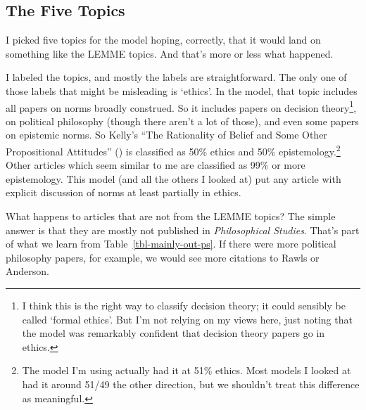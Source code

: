 \documentclass[
  10pt,
  letterpaper,
  DIV=11,
  numbers=noendperiod,
  twoside]{scrartcl}
\begin{document}
\subsection{The Five Topics}\label{sec-five-topics}

I picked five topics for the model hoping, correctly, that it would land
on something like the LEMME topics. And that's more or less what
happened.

I labeled the topics, and mostly the labels are straightforward. The
only one of those labels that might be misleading is `ethics'. In the
model, that topic includes all papers on norms broadly construed. So it
includes papers on decision theory\footnote{I think this is the right
  way to classify decision theory; it could sensibly be called `formal
  ethics'. But I'm not relying on my views here, just noting that the
  model was remarkably confident that decision theory papers go in
  ethics.}, on political philosophy (though there aren't a lot of
those), and even some papers on epistemic norms. So Kelly's ``The
Rationality of Belief and Some Other Propositional Attitudes''
() is classified as 50\%
ethics and 50\% epistemology.\footnote{The model I'm using actually had
  it at 51\% ethics. Most models I looked at had it around 51/49 the
  other direction, but we shouldn't treat this difference as meaningful.}
Other articles which seem similar to me are classified as 99\% or more
epistemology. This model (and all the others I looked at) put any
article with explicit discussion of norms at least partially in ethics.

What happens to articles that are not from the LEMME topics? The simple
answer is that they are mostly not published in \emph{Philosophical
Studies}. That's part of what we learn from
Table~\ref{tbl-mainly-out-ps}. If there were more political philosophy
papers, for example, we would see more citations to Rawls or Anderson.
\end{document}
